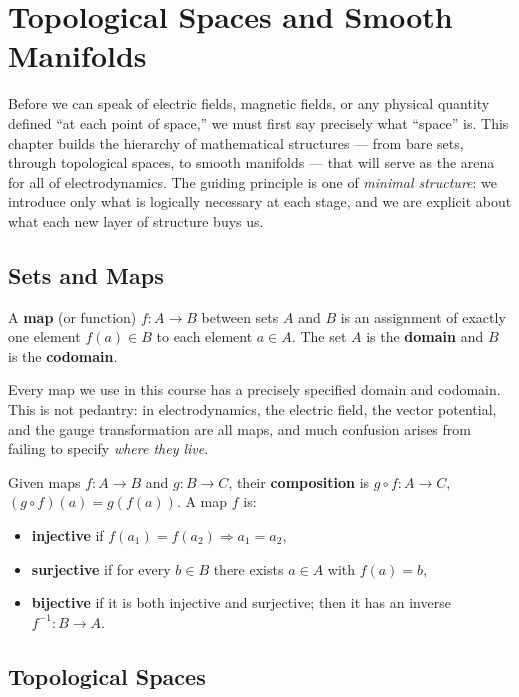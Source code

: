\chapter{Topological Spaces and Smooth Manifolds}

Before we can speak of electric fields, magnetic fields, or any physical quantity defined ``at each point of space,'' we must first say precisely what ``space'' is. This chapter builds the hierarchy of mathematical structures --- from bare sets, through topological spaces, to smooth manifolds --- that will serve as the arena for all of electrodynamics. The guiding principle is one of \emph{minimal structure}: we introduce only what is logically necessary at each stage, and we are explicit about what each new layer of structure buys us.

\section{Sets and Maps}

\begin{definition}[Map]
A \textbf{map} (or function) $f: A \to B$ between sets $A$ and $B$ is an assignment of exactly one element $f(a) \in B$ to each element $a \in A$. The set $A$ is the \textbf{domain} and $B$ is the \textbf{codomain}.
\end{definition}

Every map we use in this course has a precisely specified domain and codomain. This is not pedantry: in electrodynamics, the electric field, the vector potential, and the gauge transformation are all maps, and much confusion arises from failing to specify \emph{where they live}.

\begin{definition}
Given maps $f: A \to B$ and $g: B \to C$, their \textbf{composition} is $g \circ f: A \to C$, $(g\circ f)(a) = g(f(a))$. A map $f$ is:
\begin{itemize}
\item \textbf{injective} if $f(a_1) = f(a_2) \Rightarrow a_1 = a_2$,
\item \textbf{surjective} if for every $b \in B$ there exists $a \in A$ with $f(a) = b$,
\item \textbf{bijective} if it is both injective and surjective; then it has an inverse $f^{-1}: B \to A$.
\end{itemize}
\end{definition}

\section{Topological Spaces}

